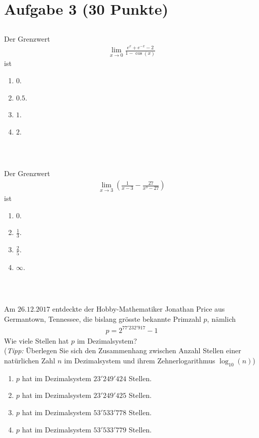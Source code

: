 \newpage
\section*{Aufgabe 3 (30 Punkte)}
\vspace{0.4cm}

\subsection*{}
Der  Grenzwert
\begin{align*}
\lim \limits_{x\to 0} 
\frac{e^x + e^{-x} -2}{1 - \cos(x)}
\end{align*}
ist
\renewcommand{\labelenumi}{(\alph{enumi})}
\begin{enumerate}
\item 
$ 0 $.
\item
$ 0.5 $.
\item
$ 1 $.
\item
$ 2 $.
\end{enumerate}
\ \\
\subsection*{}
Der Grenzwert
\begin{align*}
\lim \limits_{x \to 3} 
\left(\frac{1}{x-3} - \frac{27}{x^3 - 27}\right)
\end{align*}
ist
\renewcommand{\labelenumi}{(\alph{enumi})}
\begin{enumerate}
\item 
$ 0 $.
\item
$ \frac{1}{3} $.
\item
$ \frac{2}{5} $.
\item
$ \infty $.
\end{enumerate}
\ \\
\subsection*{}
Am $ 26.12.2017 $ entdeckte der Hobby-Mathematiker Jonathan Price aus Germantown, Tennessee, die bislang grösste bekannte Primzahl $ p $, nämlich
\begin{align*}
p = 2^{77'232'917} -1
\end{align*}
Wie viele Stellen hat $ p $ im Dezimalsystem?\\
(\textit{Tipp:} Überlegen Sie sich den Zusammenhang zwischen Anzahl Stellen einer natürlichen Zahl $ n $ im Dezimalsystem und ihrem Zehnerlogarithmus $ \log_{10}(n) $) 
\renewcommand{\labelenumi}{(\alph{enumi})}
\begin{enumerate}
\item 
$ p $ hat im Dezimalsystem $ 23'249'424 $ Stellen.
\item
$ p $ hat im Dezimalsystem $ 23'249'425 $ Stellen.
\item
$ p $ hat im Dezimalsystem $ 53'533'778 $ Stellen.
\item
$ p $ hat im Dezimalsystem $ 53'533'779 $ Stellen.
\end{enumerate}
\ \\

